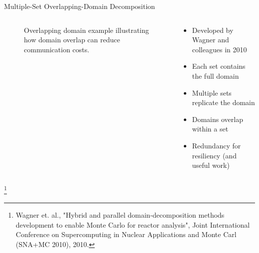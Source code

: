 \documentclass{beamer}
\begin{document}
\begin{frame}{Multiple-Set Overlapping-Domain Decomposition}

  \begin{columns}

    \begin{column}{0.5\textwidth}
      \begin{figure}[htpb!]
        \begin{center}
          \scalebox{0.75}{  }
        \end{center}
        \caption{\small Overlapping domain example illustrating how
          domain overlap can reduce communication costs.}
      \end{figure}
    \end{column}

    \begin{column}{0.5\textwidth}
      \begin{itemize}
      \item Developed by Wagner and colleagues in 2010
        \medskip
      \item Each set contains the full domain
        \medskip
      \item Multiple sets replicate the domain
        \medskip
      \item Domains overlap within a set
        \medskip
      \item Redundancy for resiliency (and useful work)
      \end{itemize}
    \end{column}

  \end{columns}

  \let\thefootnote\relax\footnote{\tiny{Wagner et. al., "Hybrid and
      parallel domain-decomposition methods development to enable
      Monte Carlo for reactor analysis", Joint International
      Conference on Supercomputing in Nuclear Applications and Monte
      Carl (SNA+MC 2010), 2010.}}
\end{frame}
\end{document}
